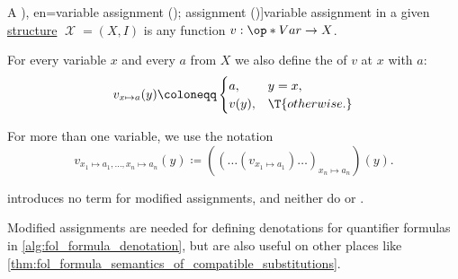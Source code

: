 \begin{definition}\label{def:fol_variable_assignment}
  A \term[ru=оценка (\cite[def. 2.2.7]{Герасимов2014Вычислимость}), en=variable assignment (\cite[271]{Farmer2008STTVirtues}); assignment (\cite[def. 2.1.17]{Hinman2005Logic})]{variable assignment} in a given \hyperref[def:fol_structure]{structure} \( \mscrX = (X, I) \) is any function \( v: \op*{Var} \to X \).

  For every variable \( x \) and every \( a \) from \( X \) we also define the  of \( v \) at \( x \) with \( a \):
  \begin{equation*}
    v_{x \mapsto a}(y) \coloneqq \begin{cases}
      a,    &y = x, \\
      v(y), &\T{otherwise.}
    \end{cases}
  \end{equation*}

  For more than one variable, we use the notation
  \begin{equation*}
    v_{x_1 \mapsto a_1, \ldots, x_n \mapsto a_n}(y) \coloneqq ((\ldots(v_{x_1 \mapsto a_1})\ldots)_{x_n \mapsto a_n})(y).
  \end{equation*}
\end{definition}
\begin{comments}
  \item \Textcite{Andrews2002Logic} introduces no term for modified assignments, and neither do \cite[rem. 2.2.17]{Hinman2005Logic} or \cite[def. 2.2.9]{Герасимов2014Вычислимость}.

  \item Modified assignments are needed for defining denotations for quantifier formulas in \cref{alg:fol_formula_denotation}, but are also useful on other places like \cref{thm:fol_formula_semantics_of_compatible_substitutions}.
\end{comments}

